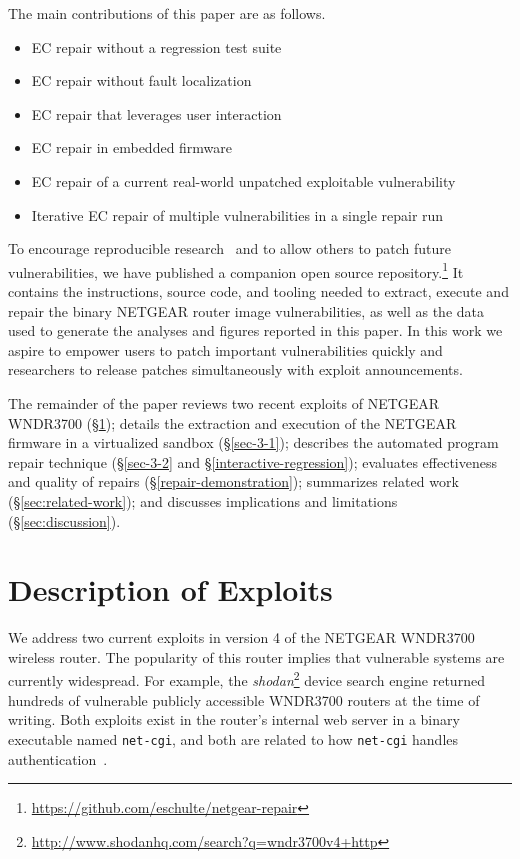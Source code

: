 \documentclass{sig-alternate}
\begin{document}
The main contributions of this paper are as follows.
\begin{itemize}
\item EC repair without a regression test suite
\item EC repair without fault localization
\item EC repair that leverages user interaction
\item EC repair in embedded firmware
\item EC repair of a current real-world unpatched exploitable
  vulnerability
\item Iterative EC repair of multiple vulnerabilities in a
  single repair run
\end{itemize}

To encourage reproducible
research~\cite{buckheit1995wavelab,mesirov2010accessible} and to allow
others to patch future vulnerabilities, we have published a companion
open source
repository.\footnote{\url{https://github.com/eschulte/netgear-repair}}
It contains the instructions, source code, and tooling needed to
extract, execute and repair the binary NETGEAR router image
vulnerabilities, as well as the data used to generate the analyses and
figures reported in this paper.  In this work we aspire to empower
users to patch important vulnerabilities quickly and researchers to
release patches simultaneously with exploit announcements.

The remainder of the paper reviews two recent exploits of NETGEAR
WNDR3700 (\S\ref{sec-2}); details the extraction and execution of the
NETGEAR firmware in a virtualized sandbox (\S\ref{sec-3-1}); describes
the automated program repair technique (\S\ref{sec-3-2} and
\S\ref{interactive-regression}); evaluates effectiveness and quality
of repairs (\S\ref{repair-demonstration}); summarizes related work
(\S\ref{sec:related-work}); and discusses implications and limitations
(\S\ref{sec:discussion}).


\section{Description of Exploits}
\label{sec-2}
We address two current exploits in version 4 of the NETGEAR WNDR3700
wireless router. The popularity of this router implies that vulnerable
systems are currently widespread. For example, the {\em
  shodan}\footnote{\url{http://www.shodanhq.com/search?q=wndr3700v4+http}}
device search engine returned hundreds of vulnerable publicly
accessible WNDR3700 routers at the time of writing.  Both exploits
exist in the router's internal web server in a binary executable named
\texttt{net-cgi}, and both are related to how \texttt{net-cgi} handles
authentication~\cite{zcutlip}.
\end{document}

